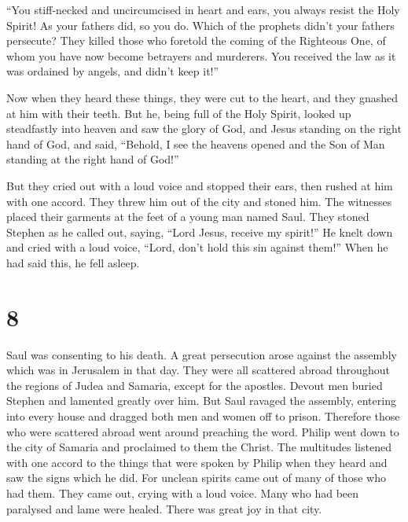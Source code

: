  ``You stiff-necked and uncircumcised in heart and ears,
you always resist the Holy Spirit! As your fathers did, so you do.
 Which of the prophets didn't your fathers persecute?
They killed those who foretold the coming of the Righteous One, of whom
you have now become betrayers and murderers.  You
received the law as it was ordained by angels, and didn't keep it!''

 Now when they heard these things, they were cut to the
heart, and they gnashed at him with their teeth.  But he,
being full of the Holy Spirit, looked up steadfastly into heaven and saw
the glory of God, and Jesus standing on the right hand of God,
 and said, ``Behold, I see the heavens opened and the Son
of Man standing at the right hand of God!''

 But they cried out with a loud voice and stopped their
ears, then rushed at him with one accord.  They threw him
out of the city and stoned him. The witnesses placed their garments at
the feet of a young man named Saul.  They stoned Stephen
as he called out, saying, ``Lord Jesus, receive my spirit!''
 He knelt down and cried with a loud voice, ``Lord, don't
hold this sin against them!'' When he had said this, he fell asleep.

\hypertarget{section-7}{%
\section{8}\label{section-7}}

 Saul was consenting to his death. A great persecution
arose against the assembly which was in Jerusalem in that day. They were
all scattered abroad throughout the regions of Judea and Samaria, except
for the apostles.  Devout men buried Stephen and lamented
greatly over him.  But Saul ravaged the assembly, entering
into every house and dragged both men and women off to prison.
 Therefore those who were scattered abroad went around
preaching the word.  Philip went down to the city of
Samaria and proclaimed to them the Christ.  The multitudes
listened with one accord to the things that were spoken by Philip when
they heard and saw the signs which he did.  For unclean
spirits came out of many of those who had them. They came out, crying
with a loud voice. Many who had been paralysed and lame were healed.
 There was great joy in that city.

